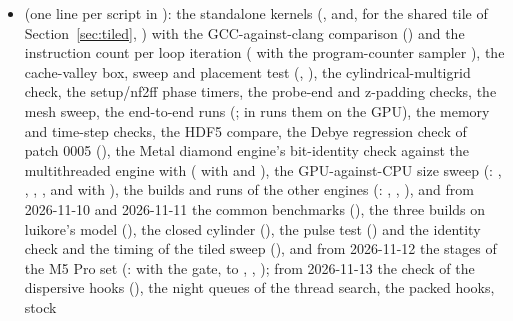 \begin{itemize}
  speed table of 2026-11-12 (, Section~\ref{sec:cg33}); the earlier records carry
  dated notes where this paper's later sections correct them. From 2026-11-15, the third machine, an M5 Max Mac Studio
  (Section~\ref{sec:studio}): the speed table, stock at eight thread counts, bandwidth, thread sweep, the two boards end to end,
  the tiled sweep, the valley and the switches, all of cg33 ().
\item {} (one line per script in ): the standalone kernels (,
   and, for the shared tile of Section~\ref{sec:tiled}, ) with the
  GCC-against-clang comparison () and the instruction count per
  loop iteration ( with the program-counter sampler ), the cache-valley
  box, sweep and placement test (, ), the cylindrical-multigrid check, the
  setup/nf2ff phase timers, the probe-end and z-padding checks, the mesh sweep, the end-to-end runs
  (;  in  runs them on the GPU), the memory and
  time-step checks, the HDF5 compare, the Debye regression check of patch 0005 (),
  the Metal diamond engine's bit-identity check against the multithreaded engine with 
  ( with  and ), the
  GPU-against-CPU size sweep (: , , ,
  , and  with ), the builds and runs of the other engines
  (: , , ), and from 2026-11-10 and
  2026-11-11 the common benchmarks (), the three builds on luikore's model
  (), the closed cylinder (), the pulse test
  () and the identity check and the timing of the tiled sweep (),
  and from 2026-11-12 the stages of the M5 Pro set (:  with the gate,
   to , , ); from 2026-11-13 the check of the
  dispersive hooks (), the night queues of the thread search, the packed hooks, stock

\end{itemize}
